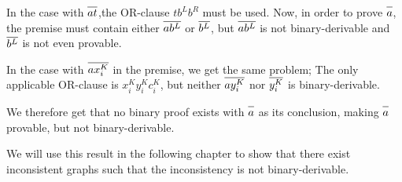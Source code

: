 In the case with $\ol{at}$,the OR-clause $tb^Lb^R$ must be used.
Now, in order to prove $\ol{a}$, the premise must contain either $\ol{a b^L}$ or $\ol{b^L}$, but $\ol{a b^L}$ is not binary-derivable and $\ol{b^L}$ is not even provable.

In the case with $\ol{ax^K_i}$ in the premise, we get the same problem;
The only applicable OR-clause is $x^K_iy^K_ic^K_i$, but neither $\ol{a y^K_i}$ nor $\ol{y^K_i}$ is binary-derivable.

We therefore get that no binary proof exists with $\ol{a}$ as its conclusion, making $\ol{a}$ provable, but not binary-derivable.

We will use this result in the following chapter to show that there exist inconsistent graphs such that the inconsistency is not binary-derivable.
